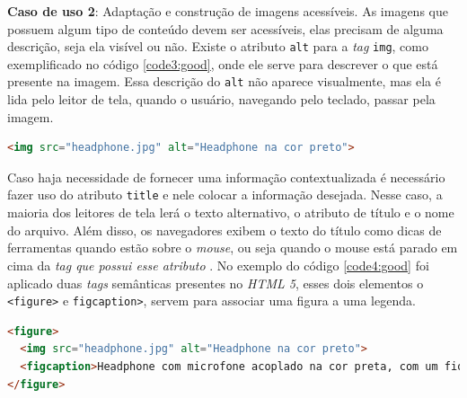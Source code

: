 \vspace{1.5cm}
{\textbf{Caso de uso 2}: Adaptação e construção de imagens acessíveis.
As imagens que possuem algum tipo de conteúdo devem ser acessíveis, elas precisam de alguma descrição, seja ela visível ou não. Existe o atributo \lstinline{alt} para a \textit{tag} \lstinline{img}, como exemplificado no código \ref{code3:good}, onde ele serve para descrever o que está presente na imagem. Essa descrição do \lstinline{alt} não aparece visualmente, mas ela é lida pelo leitor de tela, quando o usuário, navegando pelo teclado, passar pela imagem.}
{\begin{lstlisting}[language=html,caption={Uso atributo \lstinline{alt} para descrever o item da imagem.}, label=code3:good]
<img src="headphone.jpg" alt="Headphone na cor preto"> 
\end{lstlisting}}
Caso haja necessidade de fornecer uma informação contextualizada é necessário fazer uso do atributo \lstinline{title} e nele colocar a informação desejada. Nesse caso, a maioria dos leitores de tela lerá o texto alternativo, o atributo de título e o nome do arquivo. Além disso, os navegadores exibem o texto do título como dicas de ferramentas quando estão sobre o \textit{mouse}, ou seja quando o mouse está parado em cima da \textit{tag que possui esse atributo} . No exemplo do código \ref{code4:good} foi aplicado duas \textit{tags} semânticas presentes no \textit{HTML 5}, esses dois elementos o \lstinline{<figure>} e \lstinline{figcaption>}, servem para associar uma figura a uma legenda. 
{\begin{lstlisting}[language=html,caption={Uso do atributo \textit{alt} em conjunto com as \textit{tags} \textit{figure} e \textit{figurecaption}.}, label=code4:good]
<figure>
  <img src="headphone.jpg" alt="Headphone na cor preto"> 
  <figcaption>Headphone com microfone acoplado na cor preta, com um fio de ótima construção</figcaption>
</figure>
\end{lstlisting}}

